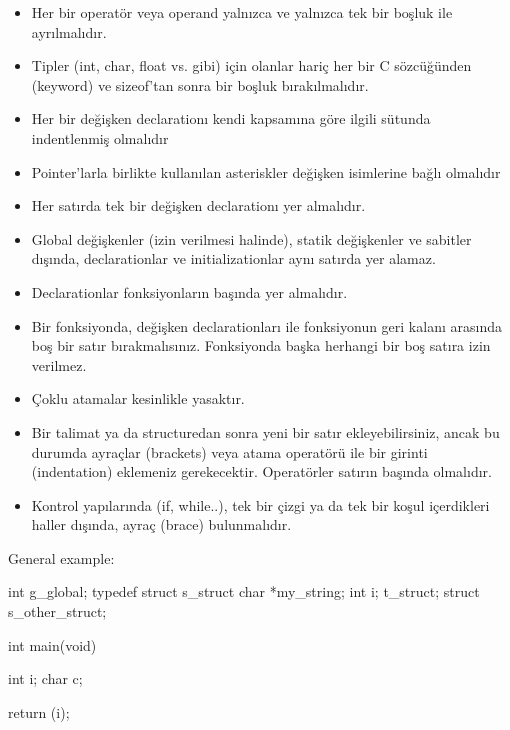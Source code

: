 \documentclass{42-en}
\begin{document}
\begin{itemize}
                \item Her bir operatör veya operand yalnızca ve yalnızca tek bir boşluk ile ayrılmalıdır.

                \item Tipler (int, char, float vs. gibi) için olanlar hariç her bir C sözcüğünden (keyword) ve sizeof’tan sonra bir
boşluk bırakılmalıdır.

                \item Her bir değişken declarationı kendi kapsamına göre ilgili sütunda indentlenmiş olmalıdır

                \item Pointer’larla birlikte kullanılan asteriskler değişken isimlerine bağlı olmalıdır

                \item Her satırda tek bir değişken declarationı yer almalıdır.

                \item Global değişkenler (izin verilmesi halinde), statik değişkenler ve sabitler dışında, declarationlar ve initializationlar aynı satırda yer alamaz.

                \item Declarationlar fonksiyonların başında yer almalıdır.

                \item Bir fonksiyonda, değişken declarationları ile fonksiyonun geri kalanı arasında boş bir satır bırakmalısınız.
Fonksiyonda başka herhangi bir boş satıra izin verilmez.

                \item Çoklu atamalar kesinlikle yasaktır.

                \item Bir talimat ya da structuredan sonra yeni bir satır ekleyebilirsiniz, ancak bu durumda ayraçlar (brackets)
veya atama operatörü ile bir girinti (indentation) eklemeniz gerekecektir. Operatörler satırın başında olmalıdır.

                \item Kontrol yapılarında (if, while..), tek bir çizgi ya da tek bir koşul içerdikleri haller dışında, ayraç (brace)
bulunmalıdır.

            \end{itemize}

            \newpage

            General example:
            \begin{42ccode}
int             g_global;
typedef struct  s_struct
{
    char    *my_string;
    int     i;
}               t_struct;
struct          s_other_struct;

int     main(void)
{
    int     i;
    char    c;

    return (i);
}
            \end{42ccode}
            \newpage
\end{document}
